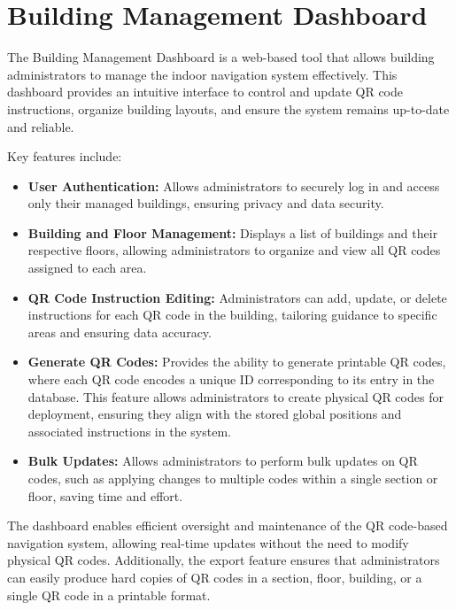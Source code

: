 \section{Building Management Dashboard}

The Building Management Dashboard is a web-based tool that allows building administrators to manage the indoor navigation system effectively. This dashboard provides an intuitive interface to control and update QR code instructions, organize building layouts, and ensure the system remains up-to-date and reliable.

Key features include:
\begin{itemize}
	\item \textbf{User Authentication:} Allows administrators to securely log in and access only their managed buildings, ensuring privacy and data security.
	\item \textbf{Building and Floor Management:} Displays a list of buildings and their respective floors, allowing administrators to organize and view all QR codes assigned to each area.
	\item \textbf{QR Code Instruction Editing:} Administrators can add, update, or delete instructions for each QR code in the building, tailoring guidance to specific areas and ensuring data accuracy.
	\item \textbf{Generate QR Codes:} Provides the ability to generate printable QR codes, where each QR code encodes a unique ID corresponding to its entry in the database. This feature allows administrators to create physical QR codes for deployment, ensuring they align with the stored global positions and associated instructions in the system.
	\item \textbf{Bulk Updates:} Allows administrators to perform bulk updates on QR codes, such as applying changes to multiple codes within a single section or floor, saving time and effort.

\end{itemize}

The dashboard enables efficient oversight and maintenance of the QR code-based navigation system, allowing real-time updates without the need to modify physical QR codes. Additionally, the export feature ensures that administrators can easily produce hard copies of QR codes in a section, floor, building, or a single QR code in a printable format. 
